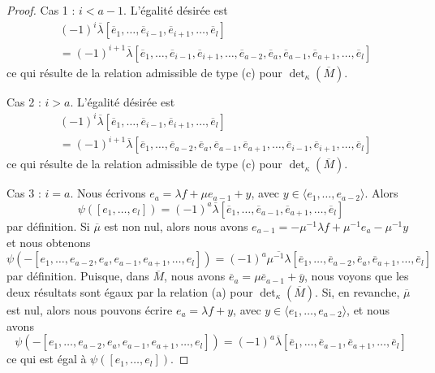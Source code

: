 \begin{proof}
\medskip\noindent
Cas 1 : $i < a - 1$. L'égalité désirée est
\begin{align*}
& (-1)^i
\overline{\lambda}
[\overline{e}_1,
\ldots,
\overline{e}_{i - 1},
\overline{e}_{i + 1},
\ldots,
\overline{e}_l] \\
& =
(-1)^{i + 1}
\overline{\lambda}
[\overline{e}_1,
\ldots,
\overline{e}_{i - 1},
\overline{e}_{i + 1},
\ldots,
\overline{e}_{a - 2},
\overline{e}_a,
\overline{e}_{a - 1},
\overline{e}_{a + 1},
\ldots,
\overline{e}_l]
\end{align*}
ce qui résulte de la relation admissible de type (c) pour
$\det_\kappa(\overline{M})$.

\medskip\noindent
Cas 2 : $i > a$. L'égalité désirée est
\begin{align*}
& (-1)^i
\overline{\lambda}
[\overline{e}_1,
\ldots,
\overline{e}_{i - 1},
\overline{e}_{i + 1},
\ldots,
\overline{e}_l] \\
& =
(-1)^{i + 1}
\overline{\lambda}
[\overline{e}_1,
\ldots,
\overline{e}_{a - 2},
\overline{e}_a,
\overline{e}_{a - 1},
\overline{e}_{a + 1},
\ldots,
\overline{e}_{i - 1},
\overline{e}_{i + 1},
\ldots,
\overline{e}_l]
\end{align*}
ce qui résulte de la relation admissible de type (c) pour
$\det_\kappa(\overline{M})$.

\medskip\noindent
Cas 3 : $i = a$. Nous écrivons $e_a = \lambda f + \mu e_{a - 1} + y$,
avec $y \in \langle e_1, \ldots, e_{a - 2}\rangle$. Alors
$$
\psi([e_1, \ldots, e_l]) =
(-1)^a
\overline{\lambda}
[\overline{e}_1,
\ldots,
\overline{e}_{a - 1},
\overline{e}_{a + 1},
\ldots,
\overline{e}_l]
$$
par définition. Si $\overline{\mu}$ est non nul, alors nous avons
$e_{a - 1} = - \mu^{-1} \lambda f + \mu^{-1}e_a - \mu^{-1} y$
et nous obtenons
$$
\psi(-[e_1, \ldots, e_{a - 2}, e_a, e_{a - 1}, e_{a + 1}, \ldots, e_l]) =
(-1)^a
\overline{\mu^{-1}\lambda}
[\overline{e}_1,
\ldots,
\overline{e}_{a - 2},
\overline{e}_a,
\overline{e}_{a + 1},
\ldots,
\overline{e}_l]
$$
par définition. Puisque, dans $\overline{M}$, nous avons
$\overline{e}_a = \mu \overline{e}_{a - 1} + \overline{y}$, nous voyons
que les deux résultats sont égaux par la relation (a) pour $\det_\kappa(\overline{M})$.
Si, en revanche, $\overline{\mu}$ est nul, alors nous pouvons écrire
$e_a = \lambda f + y$, avec $y \in \langle e_1, \ldots, e_{a - 2}\rangle$,
et nous avons
$$
\psi(-[e_1, \ldots, e_{a - 2}, e_a, e_{a - 1}, e_{a + 1}, \ldots, e_l]) =
(-1)^a
\overline{\lambda}
[\overline{e}_1,
\ldots,
\overline{e}_{a - 1},
\overline{e}_{a + 1},
\ldots,
\overline{e}_l]
$$
ce qui est égal à $\psi([e_1, \ldots, e_l])$.


\end{proof}
